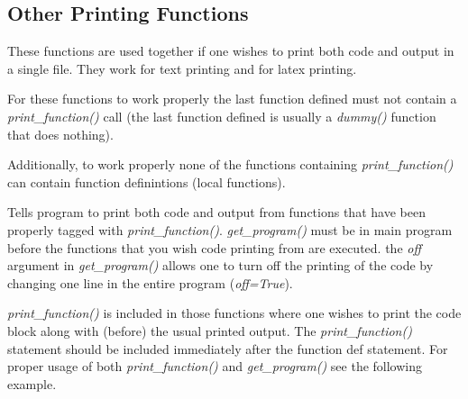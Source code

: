 \documentclass[letterpaper,10pt,english]{sphinxmanual}
\begin{document}
\subsection{Other Printing Functions}
\label{GA:other-printing-functions}
These functions are used together if one wishes to print both code and
output in a single file.  They work for text printing and for latex printing.

For these functions to work properly the last function defined must not
contain a \emph{print\_function()} call (the last function defined is usually a
\emph{dummy()} function that does nothing).

Additionally, to work properly none of the functions containing \emph{print\_function()}
can contain function definintions (local functions).

\begin{fulllineitems}
\label{GA:get_program}
Tells program to print both code and output from functions that have been
properly tagged with \emph{print\_function()}.  \emph{get\_program()} must be in
main program before the functions that you wish code printing from are
executed. the \emph{off} argument in \emph{get\_program()} allows one to turn off
the printing of the code by changing one line in the entire program
(\emph{off=True}).

\end{fulllineitems}


\begin{fulllineitems}
\label{GA:print_function}
\emph{print\_function()} is included in those functions where one wishes to
print the code block along with (before) the usual printed output.  The
\emph{print\_function()} statement should be included immediately after the
function def statement.  For proper usage of both  \emph{print\_function()}
and \emph{get\_program()} see the following example.

\end{fulllineitems}
\end{document}
